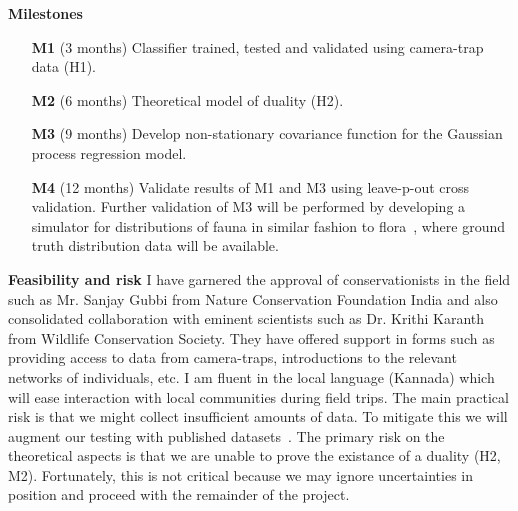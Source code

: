 \documentclass[a4paper,10pt,twocolumn]{article}
\newcommand{\hdg}[1] {\noindent \textbf{#1} }
\begin{document}
\hdg{Milestones}
\begin{enumerate} [topsep=-1ex,itemsep=-.1ex,leftmargin=1ex,itemindent=3ex]
 \item [\textbf{M1}] (3  months) Classifier trained, tested and validated using camera-trap data (H1).
 \item [\textbf{M2}] (6  months) Theoretical model of duality (H2).
 \item [\textbf{M3}] (9 months) Develop non-stationary covariance function for the Gaussian process regression model.
 \item [\textbf{M4}] (12 months) Validate results of M1 and M3 using leave-p-out cross validation. Further validation of M3 will be performed by developing a simulator for distributions of fauna in similar fashion to flora~\cite{Bradbury15Guided}, where ground truth distribution data will be available.
 \end{enumerate}
\vspace{2.5ex}

\hdg{Feasibility and risk}
I have garnered the approval of conservationists in the field such as Mr. Sanjay Gubbi from Nature Conservation Foundation India and also consolidated collaboration with eminent scientists such as Dr. Krithi Karanth from Wildlife Conservation Society. They have offered support in forms such as providing access to data from camera-traps, introductions to the relevant networks of individuals, etc. I am fluent in the local language (Kannada) which will ease interaction with local communities during field trips. The main practical risk is that we might collect insufficient amounts of data. To mitigate this we will augment our testing with published datasets~\cite{yu2013automated}. The primary risk on the theoretical aspects is that we are unable to prove the existance of a duality (H2, M2). Fortunately, this is not critical because we may ignore uncertainties in position and proceed with the remainder of the project.



% 
% 
% 
% 
% 
% 
% 
% 



\vspace{-1em}
% 
{  \footnotesize }

\end{document}
